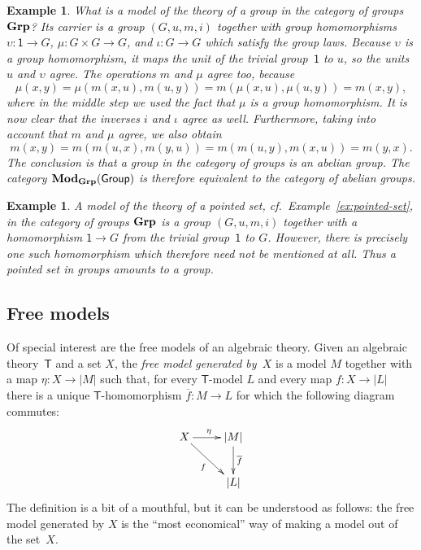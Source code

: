 \documentclass{amsart}
\newcommand{\theory}[1]{\mathsf{#1}} %
\newcommand{\ModC}[2]{\text{\textbf{Mod}}_{\category{#1}}(\theory{#2})} %
\newcommand{\category}[1]{\text{\textbf{#1}}} %
\newcommand{\one}{\mathsf{1}} %
\newtheorem{example}[definition]{Example}
\begin{document}
\begin{example}
  What is a model of the theory of a group in the category of groups $\category{Grp}$? Its
  carrier is a group $(G, u, m, i)$ together with group homomorphisms
  $\upsilon : \one \to G$, $\mu : G \times G \to G$, and $\iota : G \to G$ which satisfy
  the group laws. Because $\upsilon$ is a group homomorphism, it maps the unit of the
  trivial group~$\one$ to $u$, so the units $u$ and $\upsilon$ agree. The operations $m$
  and $\mu$ agree too, because
  \begin{equation*}
    \mu(x, y) =
    \mu(m(x, u), m(u, y)) =
    m(\mu(x, u), \mu(u, y)) =
    m(x, y),
  \end{equation*}
  where in the middle step we used the fact that $\mu$ is a group homomorphism. It is now
  clear that the inverses $i$ and $\iota$ agree as well. Furthermore, taking into account
  that $m$ and $\mu$ agree, we also obtain
  \begin{equation*}
    m(x, y) =
    m(m(u, x), m(y, u)) =
    m(m(u, y), m(x, u)) =
    m(y, x).
  \end{equation*}
  The conclusion is that a group in the category of groups is an abelian group. The
  category $\ModC{Grp}{Group}$ is therefore equivalent to the category of abelian groups.
\end{example}

\begin{example}
  A model of the theory of a pointed set, cf.\ Example~\ref{ex:pointed-set}, in the
  category of groups $\category{Grp}$ is a group $(G, u, m, i)$ together with a
  homomorphism $\one \to G$ from the trivial group~$\one$ to $G$. However, there is
  precisely one such homomorphism which therefore need not be mentioned at all. Thus a
  pointed set in groups amounts to a group.
\end{example}


\subsection{Free models}
\label{sec:free-models}

Of special interest are the free models of an algebraic theory. Given an algebraic
theory~$\theory{T}$ and a set $X$, the \emph{free model generated by~$X$} is a model $M$
together with a map $\eta : X \to |M|$ such that, for every $\theory{T}$-model $L$ and
every map $f : X \to |L|$ there is a unique $\theory{T}$-homomorphism
$\overline{f} : M \to L$ for which the following diagram commutes:
%
\begin{equation*}
  \xymatrix{
    {X}
    \ar[r]^{\eta}
    \ar[rd]_{f}
    &
    {|M|}
    \ar[d]^{\overline{f}}
    \\
    &
    {|L|}
  }
\end{equation*}
%
The definition is a bit of a mouthful, but it can be understood as follows: the free model
generated by $X$ is the ``most economical'' way of making a model out of the set~$X$.
\end{document}
